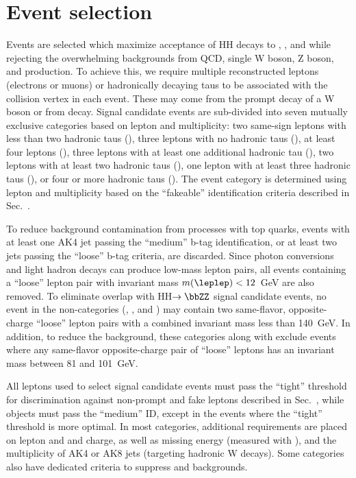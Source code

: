 \section{Event selection}
\label{sec:eventSelection}

Events are selected which maximize acceptance of HH decays to \WWWW, \WWtt, and
\tttt while rejecting the overwhelming backgrounds from QCD, single W
boson, Z boson, and \ttbar production.  To achieve this, we require multiple
reconstructed leptons \lep (electrons or muons) or hadronically decaying taus
\tauh to be associated with the collision vertex in each event.  These may come
from the prompt decay of a W boson or from \Pgt decay.  Signal candidate events
are sub-divided into seven mutually exclusive categories based on lepton and \tauh
multiplicity: two same-sign leptons with less than two hadronic taus (\llss),
three leptons with no hadronic taus (\lllnot), at least four leptons (\llll),
three leptons with at least one additional hadronic tau (\lllt), two
leptons with at least two hadronic taus (\lltt), one lepton with at least
three hadronic taus (\lttt), or four or more hadronic taus (\tttt).
The event category is determined using lepton and \tauh multiplicity based on the
``fakeable'' identification criteria described in Sec.~\cite{eventReconstruction}.

To reduce background contamination from processes with top quarks, events with
at least one AK4 jet passing the ``medium'' b-tag identification, or at least two
jets passing the ``loose'' b-tag criteria, are discarded.  Since photon conversions
and light hadron decays can produce low-mass lepton pairs, all events containing a
``loose'' lepton pair with invariant mass $m(\leplep) < 12$~GeV are also removed.
To eliminate overlap with HH$\to \bbZZ$ signal candidate events, no event in the
non-\tauh categories (\llss, \lllnot, and \llll) may contain two same-flavor,
opposite-charge ``loose'' lepton pairs with a combined invariant mass less than 140~GeV.
In addition, to reduce the \Zll background, these categories along with
\lltt exclude events where any same-flavor opposite-charge pair of ``loose''
leptons has an invariant mass between 81 and 101~GeV.


All leptons used to select signal candidate events must pass the ``tight'' threshold
for discrimination against non-prompt and fake leptons described in
Sec.~\cite{eventReconstruction}, while \tauh objects must pass the ``medium'' ID,
except in the \lllt events where the ``tight'' threshold is more optimal. 
In most categories, additional requirements are placed on lepton and \tauh \pt
and charge, as well as missing energy (measured with \metLD), and the multiplicity
of AK4 or AK8 jets (targeting hadronic W decays).  Some categories also have dedicated
criteria to suppress \Zll and \Ztt backgrounds.

